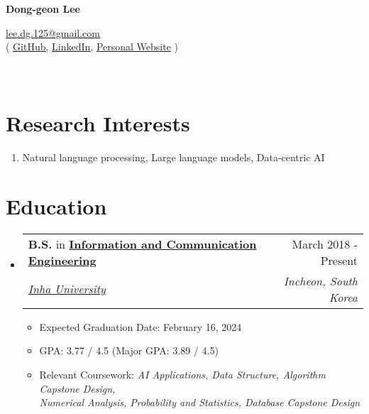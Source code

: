 \documentclass[letterpaper,11pt]{article}
\makeatletter
\newcommand{\resumeSubheading}[4]{
  \vspace{-1pt}\item
    \begin{tabular*}{0.97\textwidth}{l@{\extracolsep{\fill}}r}
      #1 & #2 \\
      \textit{\small#3} & \textit{\small #4} \\
    \end{tabular*}\vspace{-5pt}
}
\makeatother
\begin{document}
    \pagestyle{fancy}
    \thispagestyle{fancy}
    
    \begin{center}
        {\LARGE{\bf{Dong-geon Lee}}\\}
    \end{center}
    
    \vspace{-14pt}
    
    \begin{center} 
        {\href{mailto:lee.dg.125@gmail.com}{lee.dg.125@gmail.com} \\}
        {
            ( \underline{\href{https://github.com/oneonlee}{GitHub}}, 
            \underline{\href{https://www.linkedin.com/in/dong-geon-lee/}{LinkedIn}},
            \underline{\href{https://sites.google.com/view/dg-lee/}{Personal Website}} )
        }
    \end{center}

    \section{\\Research Interests}
    \begin{enumerate}[noitemsep, leftmargin=*,label={}]
    \item{Natural language processing, Large language models, Data-centric AI}
    \end{enumerate}
    
    \section{Education}
    \begin{itemize}[leftmargin=*,label=]
        \resumeSubheading
        {\textbf{B.S.} in \textbf{\href{http://bit.ly/3Uu4LTi}{Information and Communication Engineering}}}{March 2018 - Present}{\href{https://eng.inha.ac.kr/eng/index.do}{Inha University}}{Incheon, South Korea}
            \begin{itemize}[label=\bullet]
                \item{Expected Graduation Date: February 16, 2024}
                \item{GPA: 3.77 / 4.5 (Major GPA: 3.89 / 4.5)}
                \item{Relevant Coursework: \textit{AI Applications, Data Structure, Algorithm Capstone Design, \\ Numerical Analysis, Probability and Statistics, Database Capstone Design}}
            \end{itemize}
    \end{itemize}
    
\end{document}
